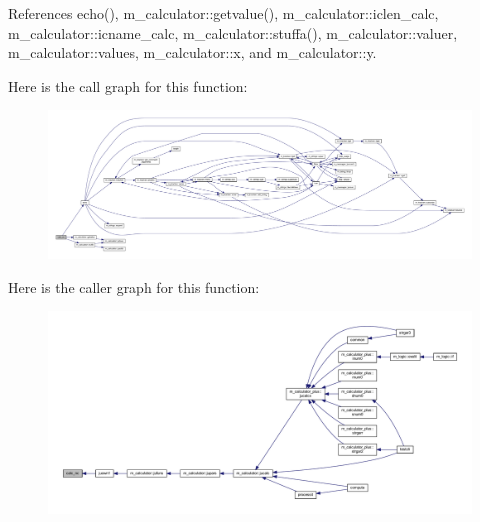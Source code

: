 References echo(), m\+\_\+calculator\+::getvalue(), m\+\_\+calculator\+::iclen\+\_\+calc, m\+\_\+calculator\+::icname\+\_\+calc, m\+\_\+calculator\+::stuffa(), m\+\_\+calculator\+::valuer, m\+\_\+calculator\+::values, m\+\_\+calculator\+::x, and m\+\_\+calculator\+::y.

Here is the call graph for this function\+:
\nopagebreak
\begin{figure}[H]
\begin{center}
\leavevmode
\includegraphics[width=350pt]{calc__NC_8f90_a099c0657056c90b5f187d2f17a292ffc_cgraph}
\end{center}
\end{figure}
Here is the caller graph for this function\+:
\nopagebreak
\begin{figure}[H]
\begin{center}
\leavevmode
\includegraphics[width=350pt]{calc__NC_8f90_a099c0657056c90b5f187d2f17a292ffc_icgraph}
\end{center}
\end{figure}
